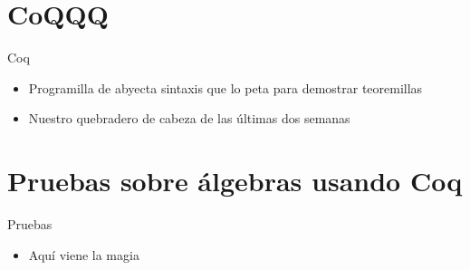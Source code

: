 \documentclass[10pt]{beamer}
\begin{document}
\section{CoQQQ}

\begin{frame}[fragile]{Coq}

  \begin{itemize}
  \item Programilla de abyecta sintaxis que lo peta para demostrar teoremillas
  \item Nuestro quebradero de cabeza de las últimas dos semanas
  \end{itemize}

\end{frame}

\section{Pruebas sobre álgebras usando Coq}

\begin{frame}[fragile]{Pruebas}

  \begin{itemize}
  \item Aquí viene la magia
  \end{itemize}

\end{frame}
\end{document}
